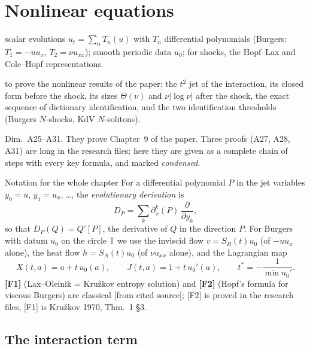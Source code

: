 \documentclass[11pt,a4paper,oneside]{report}
\newcommand{\chapterbrief}[3]{\begin{leadin}\begin{description}[itemsep=3pt,leftmargin=3.1cm,labelwidth=2.9cm,font=\sffamily\bfseries\small]
  \item[Starting from] #1
  \item[Why] #2
  \item[Role] #3
  \end{description}\end{leadin}}
\newcommand{\badge}[2]{\textcolor{#1}{\textsf{\footnotesize[#2]}}}
\newcommand{\cf}{\badge{cD}{from cited source}}
\begin{document}


\chapter{Nonlinear equations}\label{ch:cI4}
\chapterbrief
{scalar evolutions $u_t=\sum_nT_n(u)$ with $T_n$ differential polynomials (Burgers: $T_1=-uu_x$, $T_2=\nu u_{xx}$); smooth periodic data $u_0$; for shocks, the Hopf--Lax and Cole--Hopf representations.}
{to prove the nonlinear results of the paper: the $t^2$ jet of the interaction, its closed form before the shock, its sizes $\Theta(\nu)$ and $\nu|\log\nu|$ after the shock, the exact sequence of dictionary identification, and the two identification thresholds (Burgers $N$-shocks, KdV $N$-solitons).}
{Dim.~A25--A31. They prove Chapter~9 of the paper. Three proofs (A27, A28, A31) are long in the research files; here they are given as a complete chain of steps with every key formula, and marked \emph{condensed}.}

\begin{notebox}{Notation for the whole chapter}
For a differential polynomial $P$ in the jet variables $y_0=u$, $y_1=u_x$, \dots, the \emph{evolutionary derivation} is
\[
D_P=\sum_k\partial_x^k(P)\,\frac{\partial}{\partial y_k},
\]
so that $D_P(Q)=Q'[P]$, the derivative of $Q$ in the direction $P$. For Burgers with datum $u_0$ on the circle $\mathbb T$ we use the inviscid flow $v=S_B(t)u_0$ (of $-uu_x$ alone), the heat flow $h=S_A(t)u_0$ (of $\nu u_{xx}$ alone), and the Lagrangian map
\[
X(t,a)=a+t\,u_0(a),\qquad J(t,a)=1+t\,u_0'(a),\qquad t^*=-\frac{1}{\min u_0'} .
\]
\textbf{[F1]} (Lax--Oleinik = Kru\v zkov entropy solution) and \textbf{[F2]} (Hopf's formula for viscous Burgers) are classical \cf; [F2] is proved in the research files, [F1] is Kru\v zkov 1970, Thm.~1 \S3.
\end{notebox}

\section{The interaction term}
\end{document}
